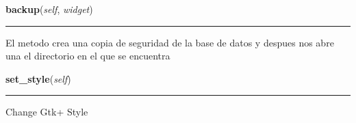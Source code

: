 \hspace{.8\funcindent}\begin{boxedminipage}{\funcwidth}

    \raggedright \textbf{backup}(\textit{self}, \textit{widget})

    \vspace{-1.5ex}

    \rule{\textwidth}{0.5\fboxrule}
\setlength{\parskip}{2ex}
    El metodo crea una copia de seguridad de la base de datos y despues nos
    abre una el directorio en el que se encuentra

\setlength{\parskip}{1ex}
    \end{boxedminipage}

    \label{main:Main:Restaurante:set_style}

    \vspace{0.5ex}

\hspace{.8\funcindent}\begin{boxedminipage}{\funcwidth}

    \raggedright \textbf{set\_style}(\textit{self})

    \vspace{-1.5ex}

    \rule{\textwidth}{0.5\fboxrule}
\setlength{\parskip}{2ex}
    Change Gtk+ Style

\setlength{\parskip}{1ex}
    \end{boxedminipage}

